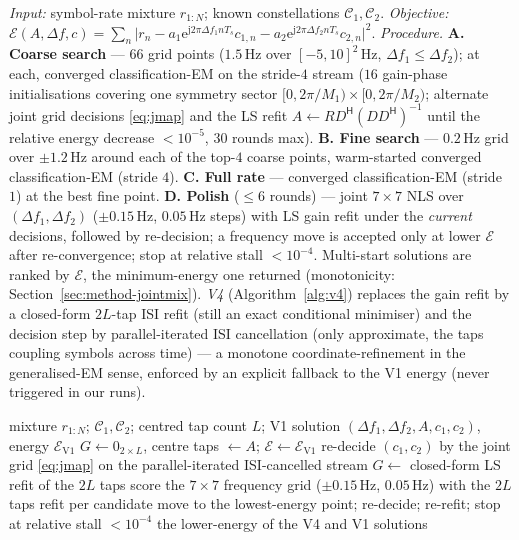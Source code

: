 \documentclass[journal]{IEEEtran}
\newcommand{\ee}{\mathrm{e}}
\newcommand{\jj}{\mathrm{j}}
\newcommand{\const}{\mathcal{C}}
\begin{document}
\emph{Input:} symbol-rate mixture $r_{1:N}$; known constellations
$\const_1, \const_2$. \emph{Objective:}
$\mathcal{E}(A, \Delta f, c) = \sum_n \big| r_n - a_1
\ee^{\jj 2\pi \Delta f_1 n T_s} c_{1,n} - a_2
\ee^{\jj 2\pi \Delta f_2 n T_s} c_{2,n} \big|^2$.
\emph{Procedure.} \textbf{A. Coarse search} --- $66$ grid points
($1.5$\,Hz over $[-5, 10]^2$\,Hz, $\Delta f_1 \leq \Delta f_2$); at
each, converged classification-EM on the stride-$4$ stream ($16$
gain-phase initialisations covering one symmetry sector
$[0, 2\pi/M_1) \times [0, 2\pi/M_2)$; alternate joint grid decisions
\eqref{eq:jmap} and the LS refit $A \leftarrow R D^{\mathsf{H}}
(D D^{\mathsf{H}})^{-1}$ until the relative energy decrease
$< 10^{-5}$, $30$ rounds max). \textbf{B. Fine search} --- $0.2$\,Hz
grid over $\pm 1.2$\,Hz around each of the top-$4$ coarse points,
warm-started converged classification-EM (stride $4$). \textbf{C. Full
rate} --- converged classification-EM (stride $1$) at the best fine
point. \textbf{D. Polish} ($\leq 6$ rounds) --- joint $7 \times 7$ NLS
over $(\Delta f_1, \Delta f_2)$ ($\pm 0.15$\,Hz, $0.05$\,Hz steps) with
LS gain refit under the \emph{current} decisions, followed by
re-decision; a frequency move is accepted only at lower $\mathcal{E}$
after re-convergence; stop at relative stall $< 10^{-4}$.
Multi-start solutions are ranked by $\mathcal{E}$, the minimum-energy
one returned (monotonicity:
Section~\ref{sec:method-jointmix}). \emph{V4}
(Algorithm~\ref{alg:v4}) replaces the gain refit by a closed-form
$2L$-tap ISI refit (still an exact conditional minimiser) and the
decision step by parallel-iterated ISI cancellation (only approximate,
the taps coupling symbols across time) --- a monotone
coordinate-refinement in the generalised-EM sense, enforced by an
explicit fallback to the V1 energy (never triggered in our runs).

\begin{algorithm}[!t]
\caption{V4: ISI-aware ECM joint synchronisation--detection}
\label{alg:v4}
\scriptsize
\begin{algorithmic}[1]
\Require mixture $r_{1:N}$; $\const_1, \const_2$; centred tap count
$L$; V1 solution $(\Delta f_1, \Delta f_2, A, c_1, c_2)$, energy
$\mathcal{E}_{\mathrm{V1}}$
\State $G \gets 0_{2 \times L}$, centre taps $\gets A$;
$\mathcal{E} \gets \mathcal{E}_{\mathrm{V1}}$
\Repeat {}
  \State re-decide $(c_1, c_2)$ by the joint grid \eqref{eq:jmap} on the
  parallel-iterated ISI-cancelled stream
  \State $G \gets$ closed-form LS refit of the $2L$ taps
  \State score the $7 \times 7$ frequency grid ($\pm 0.15$\,Hz,
  $0.05$\,Hz) with the $2L$ taps refit per candidate
  \State move to the lowest-energy point; re-decide; re-refit; stop at
  relative stall $< 10^{-4}$
\EndFor
\State \Return the lower-energy of the V4 and V1 solutions
\end{algorithmic}
\end{algorithm}
\end{document}
